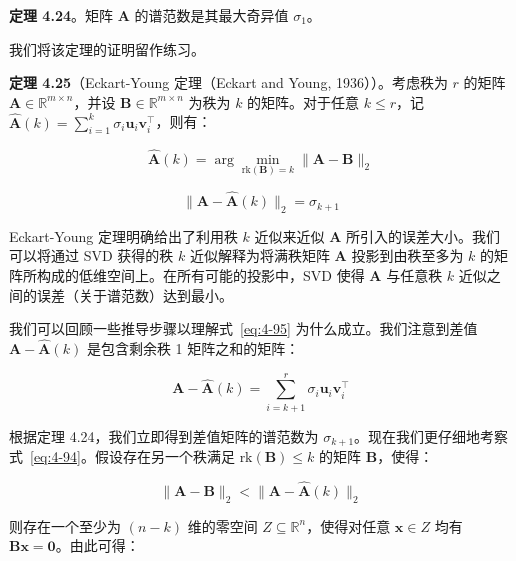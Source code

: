 \textbf{定理 4.24}。矩阵 $ \boldsymbol{A} $ 的谱范数是其最大奇异值 $ \sigma_1 $。

我们将该定理的证明留作练习。

\textbf{定理 4.25}（Eckart-Young 定理（Eckart and Young, 1936））。考虑秩为 $ r $ 的矩阵 $ \boldsymbol{A} \in \mathbb{R}^{m \times n} $，并设 $ \boldsymbol{B} \in \mathbb{R}^{m \times n} $ 为秩为 $ k $ 的矩阵。对于任意 $ k \leqslant r $，记 $ \widehat{\boldsymbol{A}}(k) = \sum_{i=1}^k \sigma_i \boldsymbol{u}_i \boldsymbol{v}_i^\top $，则有：

\begin{equation}
\widehat{\boldsymbol{A}}(k) = \arg\min_{\text{rk}(\boldsymbol{B}) = k} \|\boldsymbol{A} - \boldsymbol{B}\|_2
\tag{4.94}\label{eq:4-94}
\end{equation}

\begin{equation}
\|\boldsymbol{A} - \widehat{\boldsymbol{A}}(k)\|_2 = \sigma_{k+1}
\tag{4.95}\label{eq:4-95}
\end{equation}

Eckart-Young 定理明确给出了利用秩 $ k $ 近似来近似 $ \boldsymbol{A} $ 所引入的误差大小。我们可以将通过 SVD 获得的秩 $ k $ 近似解释为将满秩矩阵 $ \boldsymbol{A} $ 投影到由秩至多为 $ k $ 的矩阵所构成的低维空间上。在所有可能的投影中，SVD 使得 $ \boldsymbol{A} $ 与任意秩 $ k $ 近似之间的误差（关于谱范数）达到最小。

我们可以回顾一些推导步骤以理解式~\eqref{eq:4-95} 为什么成立。我们注意到差值 $ \boldsymbol{A} - \widehat{\boldsymbol{A}}(k) $ 是包含剩余秩 1 矩阵之和的矩阵：

\begin{equation}
\boldsymbol{A} - \widehat{\boldsymbol{A}}(k) = \sum_{i=k+1}^r \sigma_i \boldsymbol{u}_i \boldsymbol{v}_i^\top
\tag{4.96}\label{eq:4-96}
\end{equation}

根据定理 4.24，我们立即得到差值矩阵的谱范数为 $ \sigma_{k+1} $。现在我们更仔细地考察式~\eqref{eq:4-94}。假设存在另一个秩满足 $ \text{rk}(\boldsymbol{B}) \leqslant k $ 的矩阵 $ \boldsymbol{B} $，使得：

\begin{equation}
\|\boldsymbol{A} - \boldsymbol{B}\|_2 < \|\boldsymbol{A} - \widehat{\boldsymbol{A}}(k)\|_2
\tag{4.97}\label{eq:4-97}
\end{equation}

则存在一个至少为 $ (n - k) $ 维的零空间 $ Z \subseteq \mathbb{R}^n $，使得对任意 $ \boldsymbol{x} \in Z $ 均有 $ \boldsymbol{B} \boldsymbol{x} = \boldsymbol{0} $。由此可得：

